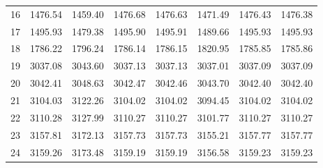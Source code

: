 \documentclass[10pt,oneside]{article}
\begin{document}
\begin{table}[h!]
\begin{tabular}{cccccccc}
16 &   1476.54 & 1459.40 & 1476.68 & 1476.63 &      1471.49 & 1476.43 & 1476.38 \\
17 &   1495.93 & 1479.38 & 1495.90 & 1495.91 &      1489.66 & 1495.93 & 1495.93 \\
18 &   1786.22 & 1796.24 & 1786.14 & 1786.15 &      1820.95 & 1785.85 & 1785.86 \\
19 &   3037.08 & 3043.60 & 3037.13 & 3037.13 &      3037.01 & 3037.09 & 3037.09 \\
20 &   3042.41 & 3048.63 & 3042.47 & 3042.46 &      3043.70 & 3042.40 & 3042.40 \\
21 &   3104.03 & 3122.26 & 3104.02 & 3104.02 &      3094.45 & 3104.02 & 3104.02 \\
22 &   3110.28 & 3127.99 & 3110.27 & 3110.27 &      3101.77 & 3110.27 & 3110.27 \\
23 &   3157.81 & 3172.13 & 3157.73 & 3157.73 &      3155.21 & 3157.77 & 3157.77 \\
24 &   3159.26 & 3173.48 & 3159.19 & 3159.19 &      3156.58 & 3159.23 & 3159.23 \\
\bottomrule
\end{tabular}
\end{table}

\clearpage
\end{document}
